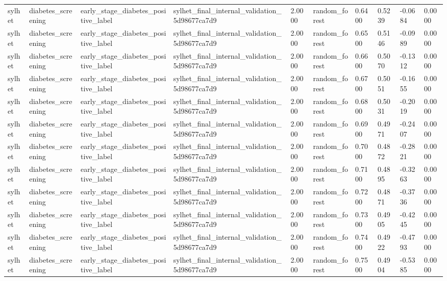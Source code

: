 \begin{tabular}{llllllllll}
sylhet & diabetes\_screening & early\_stage\_diabetes\_positive\_label & sylhet\_final\_internal\_validation\_5d98677ca7d9 & 2.0000 & random\_forest & 0.6400 & 0.5239 & -0.0684 & 0.0000 \\
sylhet & diabetes\_screening & early\_stage\_diabetes\_positive\_label & sylhet\_final\_internal\_validation\_5d98677ca7d9 & 2.0000 & random\_forest & 0.6500 & 0.5146 & -0.0989 & 0.0000 \\
sylhet & diabetes\_screening & early\_stage\_diabetes\_positive\_label & sylhet\_final\_internal\_validation\_5d98677ca7d9 & 2.0000 & random\_forest & 0.6600 & 0.5070 & -0.1312 & 0.0000 \\
sylhet & diabetes\_screening & early\_stage\_diabetes\_positive\_label & sylhet\_final\_internal\_validation\_5d98677ca7d9 & 2.0000 & random\_forest & 0.6700 & 0.5051 & -0.1655 & 0.0000 \\
sylhet & diabetes\_screening & early\_stage\_diabetes\_positive\_label & sylhet\_final\_internal\_validation\_5d98677ca7d9 & 2.0000 & random\_forest & 0.6800 & 0.5031 & -0.2019 & 0.0000 \\
sylhet & diabetes\_screening & early\_stage\_diabetes\_positive\_label & sylhet\_final\_internal\_validation\_5d98677ca7d9 & 2.0000 & random\_forest & 0.6900 & 0.4971 & -0.2407 & 0.0000 \\
sylhet & diabetes\_screening & early\_stage\_diabetes\_positive\_label & sylhet\_final\_internal\_validation\_5d98677ca7d9 & 2.0000 & random\_forest & 0.7000 & 0.4872 & -0.2821 & 0.0000 \\
sylhet & diabetes\_screening & early\_stage\_diabetes\_positive\_label & sylhet\_final\_internal\_validation\_5d98677ca7d9 & 2.0000 & random\_forest & 0.7100 & 0.4895 & -0.3263 & 0.0000 \\
sylhet & diabetes\_screening & early\_stage\_diabetes\_positive\_label & sylhet\_final\_internal\_validation\_5d98677ca7d9 & 2.0000 & random\_forest & 0.7200 & 0.4871 & -0.3736 & 0.0000 \\
sylhet & diabetes\_screening & early\_stage\_diabetes\_positive\_label & sylhet\_final\_internal\_validation\_5d98677ca7d9 & 2.0000 & random\_forest & 0.7300 & 0.4905 & -0.4245 & 0.0000 \\
sylhet & diabetes\_screening & early\_stage\_diabetes\_positive\_label & sylhet\_final\_internal\_validation\_5d98677ca7d9 & 2.0000 & random\_forest & 0.7400 & 0.4922 & -0.4793 & 0.0000 \\
sylhet & diabetes\_screening & early\_stage\_diabetes\_positive\_label & sylhet\_final\_internal\_validation\_5d98677ca7d9 & 2.0000 & random\_forest & 0.7500 & 0.4904 & -0.5385 & 0.0000 \\

\end{tabular}
